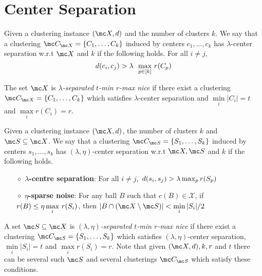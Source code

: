 \documentclass[11pt]{article}
\begin{document}
\section{Center Separation}

\begin{definition}
\label{defn:lambdacs}
Given a clustering instance $(\mc X, d)$ and the number of clusters $k$. We say that a clustering $\mc C_{\mc X} = \{C_1, \ldots, C_k\}$ induced by centers $c_1, \ldots, c_k$ has $\lambda$-center separation w.r.t $\mc X$ and $k$ if the following holds. For all $i\neq j$, 
$$d(c_i, c_j) > \lambda \enspace\max_{p \in [k]} \thinspace r(C_p)$$
\end{definition}

\noindent The set $\mc X$ is {\it $\lambda$-separated} {\it $t$-min $r$-max nice} if there exist a clustering $\mc C_{\mc X}=\{C_1,\ldots,C_k\}$ which satisfies $\lambda$-center separation and $\min\limits_{i} \lvert C_i\rvert = t$ and $\max\limits_{i} r(C_i) = r$.

\begin{definition}
Given a clustering instance $(\mc X, d)$, the number of clusters $k$ and $\mc S \subseteq \mc X$. We say that a clustering $\mc C_{\mc S} = \{S_1, \ldots, S_k\}$ induced by centers $s_1, \ldots, s_k$ has $(\lambda, \eta)$-center separation w.r.t $\mc X, \mc S$ and $k$ if the following holds.

\begin{itemize}[nolistsep, noitemsep]
\label{defn:lambdacsnoise}	

\item[$\diamond$] {\bf $\lambda$-centre separation}: For all $i\neq j$, $\thinspace d(s_i, s_j) > \lambda \max_{p} r(S_p)$
\item[$\diamond$]{\bf $\eta$-sparse noise}: For any ball $B$ such that $c(B)\in \mathcal{X}$, if $r(B)\leq \eta\max\limits_{i} \thinspace r(S_i)$, then $|B\cap (\mc X\setminus \mc S)| < \min\limits_{i} |S_i|/2$
\end{itemize}
\end{definition}

\noindent A set $\mc S \subseteq \mc X$ is {\it $(\lambda, \eta)$-separated} {\it $t$-min $r$-max nice} if there exist a clustering $\mc C_{\mc S}=\{S_1,\ldots,S_k\}$ which satisfies $(\lambda, \eta)$-center separation,  $\min\limits_{i} \lvert S_i\rvert = t$ and $\max\limits_{i} r(S_i) = r$. Note that given $(\mc X, d), k, r$ and $t$ there can be several such $\mc S$ and several clusterings $\mc C_{\mc S}$ which satisfy these conditions.
\end{document}
